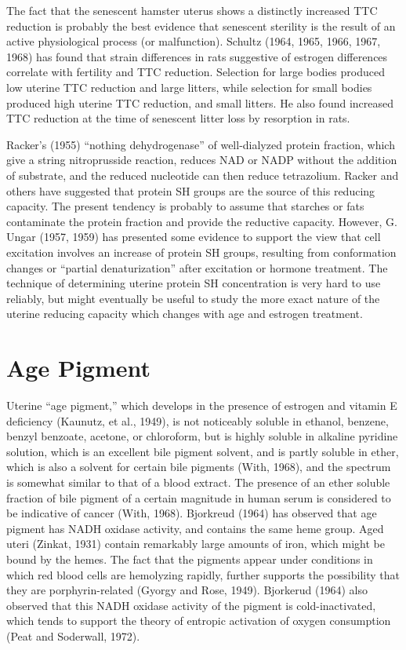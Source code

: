 The fact that the senescent hamster uterus shows a distinctly increased TTC reduction is probably the best evidence that senescent sterility is the result of an active physiological process (or malfunction). Schultz (1964, 1965, 1966, 1967, 1968) has found that strain differences in rats suggestive of estrogen differences correlate with fertility and TTC reduction. Selection for large bodies produced low uterine TTC reduction and large litters, while selection for small bodies produced high uterine TTC reduction, and small litters. He also found increased TTC reduction at the time of senescent litter loss by resorption in rats.

Racker's (1955) ``nothing dehydrogenase'' of well-dialyzed protein fraction, which give a string nitroprusside reaction, reduces NAD or NADP without the addition of substrate, and the reduced nucleotide can then reduce tetrazolium. Racker and others have suggested that protein SH groups are the source of this reducing capacity. The present tendency is probably to assume that starches or fats contaminate the protein fraction and provide the reductive capacity. However, G. Ungar (1957, 1959) has presented some evidence to support the view that cell excitation involves an increase of protein SH groups, resulting from conformation changes or ``partial denaturization'' after excitation or hormone treatment. The technique of determining uterine protein SH concentration is very hard to use reliably, but might eventually be useful to study the more exact nature of the uterine reducing capacity which changes with age and estrogen treatment.

\section{Age Pigment}

Uterine ``age pigment,'' which develops in the presence of estrogen and vitamin E deficiency (Kaunutz, et al., 1949), is not noticeably soluble in ethanol, benzene, benzyl benzoate, acetone, or chloroform, but is highly soluble in alkaline pyridine solution, which is an excellent bile pigment solvent, and is partly soluble in ether, which is also a solvent for certain bile pigments (With, 1968), and the spectrum is somewhat similar to that of a blood extract. The presence of an ether soluble fraction of bile pigment of a certain magnitude in human serum is considered to be indicative of cancer (With, 1968). Bjorkreud (1964) has observed that age pigment has NADH oxidase activity, and contains the same heme group. Aged uteri (Zinkat, 1931) contain remarkably large amounts of iron, which might be bound by the hemes. The fact that the pigments appear under conditions in which red blood cells are hemolyzing rapidly, further supports the possibility that they are porphyrin-related (Gyorgy and Rose, 1949). Bjorkerud (1964) also observed that this NADH oxidase activity of the pigment is cold-inactivated, which tends to support the theory of entropic activation of oxygen consumption (Peat and Soderwall, 1972).

